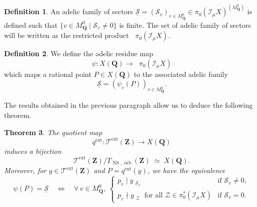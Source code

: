 \documentclass{proc-l}
\newcommand{\Z}{\mathbf{Z}}
\newcommand{\Q}{\mathbf{Q}}
\DeclareMathOperator{\NS}{NS}
\DeclareMathOperator{\orb}{orb}
\DeclareMathOperator{\ext}{ext}
\newcommand{\stackZ}{\mathcal{Z}}
\newcommand{\stackS}{\mathcal{S}}
\newcommand{\stackT}{\mathcal{T}}
\newcommand{\sheafI}{\mathcal{I}}
\newcommand{\sector}{\pi_0(\sheafI_{\mu} X)}
\newcommand{\twistsector}{\pi_0^*(\sheafI_{\mu} X)}
\newcommand{\adelicprod}{\mathop{\underset{v \in M_{\Q}^0}{\prod\nolimits'}}}
\newtheorem{theorem}{Theorem}[section]
\theoremstyle{definition}
\newtheorem{definition}[theorem]{Definition}
\theoremstyle{remark}
\numberwithin{equation}{section}
\begin{document}
\begin{definition}
    An adelic family of sectors $\underline{\stackS} = (\stackS_v)_{v \in M_{\Q}^0} \in \sector^{(M_{\Q}^0)}$ is defined such that $\{ v \in M_{\Q}^0 \mid \stackS_v \neq 0 \} $ is finite. The set of adelic family of sectors will be written as the restricted product $\adelicprod \sector$.
\end{definition}

\begin{definition}
    We define the adelic residue map $$\psi : X(\Q) \rightarrow \adelicprod \sector$$ which maps a rational point $P \in X(\Q)$ to the associated adelic family $$\underline{\stackS} = \left( \psi_v(P) \right)_{v \in M_{\Q}^0} .$$
\end{definition}

The results obtained in the previous paragraph allow us to deduce the following
theorem.

\begin{theorem}\label{theorem_description_of_the_extended_parmetrization}
The quotient map
\[
q^{\ext} : \stackT^{\ext}(\Z) \longrightarrow X(\Q)
\]
induces a bijection
\[
\stackT^{\ext}(\Z) / T_{\NS,\orb}(\Z)
\;\simeq\;
X(\Q).
\]
Moreover, for $y \in \stackT^{\ext}(\Z)$ and $P = q^{\ext}(y)$, we have the equivalence
\[
\psi(P) = \underline{\stackS}
\quad\Longleftrightarrow\quad
\forall\, v \in M_{\Q}^{0},\
\begin{cases}
p_v \mid y{}_{\substack{\stackS_v}} & \text{if } \stackS_v \neq 0, \\[4pt]
p_v \nmid y{}_{\substack{\stackZ}} \text{ for all } \stackZ \in \twistsector & \text{if } \stackS_v = 0 .
\end{cases}
\]
\end{theorem}
\end{document}
